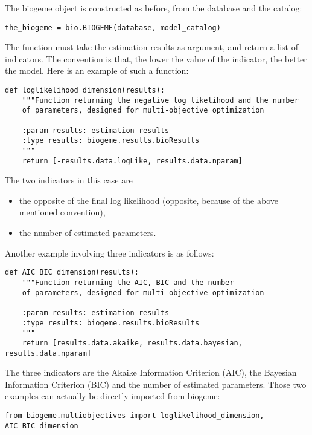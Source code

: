 \documentclass[12pt,a4paper]{article}
\begin{document}
The biogeme object is constructed as before, from the database and the catalog:
\begin{lstlisting}
the_biogeme = bio.BIOGEME(database, model_catalog)
\end{lstlisting}
The function must take the estimation results as argument, and return
a list of indicators. The convention is that, the lower the value of
the indicator, the better the model.  Here is an example of such a function:
\begin{lstlisting}
def loglikelihood_dimension(results):
    """Function returning the negative log likelihood and the number
    of parameters, designed for multi-objective optimization

    :param results: estimation results
    :type results: biogeme.results.bioResults
    """
    return [-results.data.logLike, results.data.nparam]
\end{lstlisting}
The two indicators in this case are
\begin{itemize}
\item the opposite of the final log likelihood (opposite, because of the above mentioned convention),
  \item the number of estimated parameters.
\end{itemize}
Another example involving three indicators is as follows:
\begin{lstlisting}
def AIC_BIC_dimension(results):
    """Function returning the AIC, BIC and the number
    of parameters, designed for multi-objective optimization

    :param results: estimation results
    :type results: biogeme.results.bioResults
    """
    return [results.data.akaike, results.data.bayesian, results.data.nparam]
\end{lstlisting}
The three indicators are the Akaike Information Criterion (AIC), the Bayesian Information Criterion (BIC) and the number of estimated parameters. Those two examples can actually be directly imported  from biogeme:
\begin{lstlisting}
from biogeme.multiobjectives import loglikelihood_dimension, AIC_BIC_dimension
\end{lstlisting}
\end{document}
